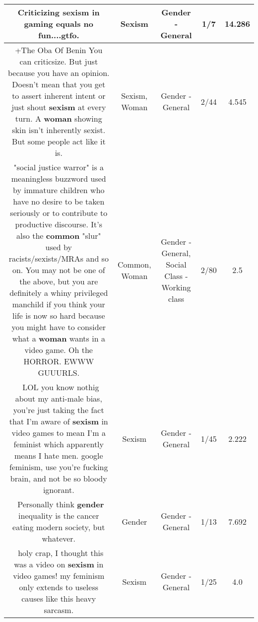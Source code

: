 \documentclass[11pt]{article}
\newlength\mylength
\begin{document}
\begin{center}
\begin{longtable}{|C{.65\mylength}|C{.30\mylength}|C{.12\mylength}|C{.12\mylength}|C{.12\mylength}|}
  \small Criticizing \textbf{sexism} in gaming equals no fun....gtfo.\normalsize   & Sexism & Gender - General & 1/7 & 14.286 \\  \hline
  \small +The Oba Of Benin You can criticsize. But just because you have an opinion. Doesn't mean that you get to assert inherent intent or just shout \textbf{sexism} at every turn. A \textbf{woman} showing skin isn't inherently sexist. But some people act like it is.\normalsize   & Sexism, Woman & Gender - General & 2/44 & 4.545 \\  \hline
  \small "social justice warror" is a meaningless buzzword used by immature children who have no desire to be taken seriously or to contribute to productive discourse. It's also the \textbf{common} "slur" used by racists/sexists/MRAs and so on. You may not be one of the above, but you are definitely a whiny privileged manchild if you think your life is now so hard because you might have to consider what a \textbf{woman} wants in a video game. Oh the HORROR. EWWW GUUURLS.\normalsize   & Common, Woman & Gender - General, Social Class - Working class & 2/80 & 2.5 \\  \hline
  \small {} LOL you know nothig about my anti-male bias, you're just taking the fact that I'm aware of \textbf{sexism} in video games to mean I'm a feminist which apparently means I hate men. google feminism, use you're fucking brain, and not be so bloody ignorant.\normalsize   & Sexism & Gender - General & 1/45 & 2.222 \\  \hline
  \small {} Personally think \textbf{gender} inequality is the cancer eating modern society, but whatever.\normalsize   & Gender & Gender - General & 1/13 & 7.692 \\  \hline
  \small {} holy crap, I thought this was a video on \textbf{sexism} in video games! my feminism only extends to useless causes like this heavy sarcasm.\normalsize   & Sexism & Gender - General & 1/25 & 4.0 \\  \hline

\end{longtable}
\end{center}
\end{document}
